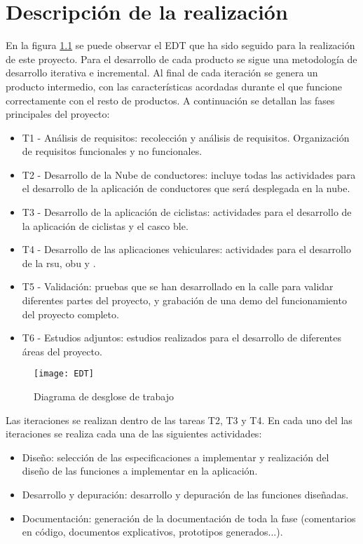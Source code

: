 \chapter{Descripción de la realización}\label{cha:descripcion_realizacion}
En la figura \ref{fig:EDT} se puede observar el EDT que ha sido seguido para la realización de este proyecto. Para el desarrollo de cada producto se sigue una metodología de desarrollo iterativa e incremental. Al final de cada iteración se genera un producto intermedio, con las características acordadas durante el que funcione correctamente con el resto de productos.  A continuación se detallan las fases principales del proyecto:
\begin{itemize}
	\item T1 - Análisis de requisitos: recolección y análisis de requisitos. Organización de requisitos funcionales y no funcionales.

	\item T2 - Desarrollo de la Nube de conductores: incluye todas las actividades para el	desarrollo de la aplicación de conductores que será desplegada en la nube.

	\item T3 - Desarrollo de la aplicación de ciclistas: actividades para el desarrollo de la aplicación de ciclistas y el casco \gls{ble}.

	\item T4 - Desarrollo de las aplicaciones vehiculares: actividades para el desarrollo de la \gls{rsu}, \gls{obu} y .

	\item T5 - Validación: pruebas que se han desarrollado en la calle para validar diferentes partes del proyecto, y grabación de una demo del funcionamiento del proyecto completo.

	\item T6 - Estudios adjuntos: estudios realizados para el desarrollo de diferentes áreas del proyecto.
\end{itemize}

\begin{figure}[t]
	\begin{center}
		 {
			\texttt{[image: EDT]}
		}
		\caption{Diagrama de desglose de trabajo}
		\label{fig:EDT}
	\end{center}
\end{figure}

Las iteraciones se realizan dentro de las tareas T2, T3 y T4. En cada uno del las iteraciones se realiza cada una de las siguientes actividades:
\begin{itemize}
	\item Diseño: selección de las especificaciones a implementar y realización 	del diseño de las funciones a implementar en la aplicación.

	\item Desarrollo y depuración: desarrollo y depuración de las funciones diseñadas.

	\item Documentación: generación de la documentación de toda la fase (comentarios en código, documentos explicativos, prototipos generados...).
\end{itemize}


